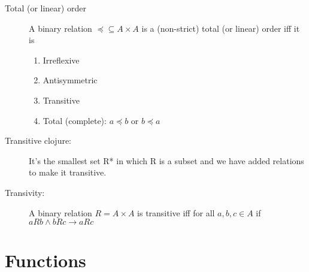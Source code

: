\documentclass[12pt]{article}
\begin{document}
\begin{description}
\item[Total (or linear) order] A binary relation $\preceq \subseteq A \times A$ is a (non-strict) total (or linear) order iff it is
\begin{enumerate}
	\item Irreflexive
	\item Antisymmetric
	\item Transitive
	\item Total (complete): $a \preceq b \textrm{ or } b \preceq a$
	\end{enumerate}	

\item[Transitive clojure:] It's the smallest set R* in which R is a subset and we have added relations to make it transitive.

\item[Transivity:] A binary relation $R = A \times A$ is transitive iff for all $a,b,c \in A$ if $aRb  \wedge bRc \rightarrow aRc$ 
\end{description}


\section{Functions}
\end{document}
